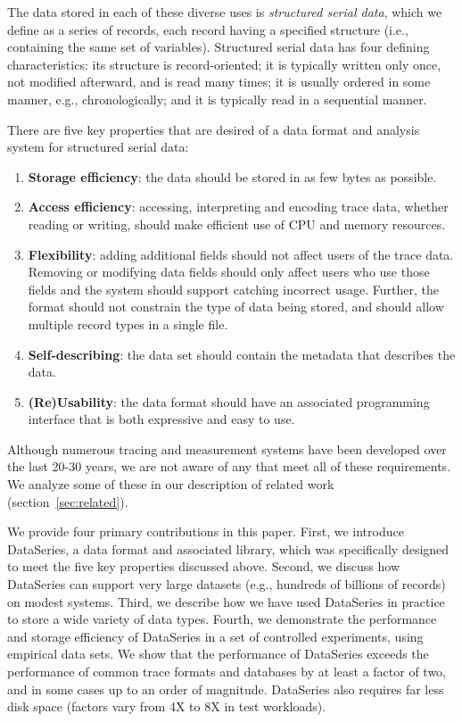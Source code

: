 \documentclass{acm_proc_article-sp}
\begin{document}
The data stored in each of these diverse uses is {\it structured
serial data}, which we define as a series of records, each record
having a specified structure (i.e., containing the same set of
variables). Structured serial data has four defining characteristics:
its structure is record-oriented; it is typically written only once,
not modified afterward, and is read many times; it is usually ordered
in some manner, e.g., chronologically; and it is typically read in a
sequential manner.  

There are five key properties that are desired of a data format
and analysis system for structured serial data:

\begin{enumerate}

\item \textbf{Storage efficiency}: the data should be stored in as few
bytes as possible.

\item \textbf{Access efficiency}: accessing, interpreting and encoding
trace data, whether reading or writing, should make efficient use of
CPU and memory resources.

\item \textbf{Flexibility}: adding additional fields should not affect
users of the trace data.  Removing or modifying data fields should
only affect users who use those fields and the system should support
catching incorrect usage.  Further, the format should not constrain
the type of data being stored, and should allow multiple record types
in a single file.

\item \textbf{Self-describing}: the data set should contain the
metadata that describes the data.

\item \textbf{(Re)Usability}: the data format should have an associated
programming interface that is both expressive and easy to use.

\end{enumerate}

Although numerous tracing and measurement systems have been developed
over the last 20-30 years, we are not aware of any that meet all of
these requirements. We analyze some of these in our description of
related work (section~\ref{sec:related}).

We provide four primary contributions in this paper.  First, we
introduce DataSeries, a data format and associated library, which was
specifically designed to meet the five key properties discussed above.
Second, we discuss how DataSeries can support very large datasets
(e.g., hundreds of billions of records) on modest systems.  Third, we
describe how we have used DataSeries in practice to store a wide
variety of data types.  Fourth, we demonstrate the performance and
storage efficiency of DataSeries in a set of controlled experiments,
using empirical data sets. We show that the performance of DataSeries
exceeds the performance of common trace formats and databases by at
least a factor of two, and in some cases up to an order of
magnitude. DataSeries also requires far less disk space (factors vary
from 4X to 8X in test workloads).
\end{document}
